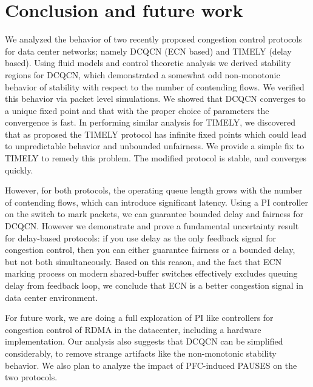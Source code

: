 \section{Conclusion and future work}
We analyzed  the behavior of two recently proposed congestion control protocols
for data center networks; namely DCQCN (ECN based) and TIMELY (delay based).
Using fluid models and control theoretic analysis we derived stability regions
for DCQCN, which demonstrated a somewhat odd non-monotonic behavior of stability
with respect to the number of contending flows. We verified this behavior via
packet level simulations. We showed that DCQCN converges to a unique
fixed point and that with the proper choice of parameters the convergence is
fast. In performing similar analysis for TIMELY, we discovered that as proposed
the TIMELY protocol has infinite fixed points which could lead to unpredictable
behavior and unbounded unfairness. We provide a simple fix to TIMELY to remedy
this problem. The modified protocol is stable, and converges quickly.

However, for both protocols, the operating queue length grows with the number of
contending flows, which can introduce significant latency. Using a PI controller
on the switch to mark packets, we can guarantee bounded delay and fairness for
DCQCN.  However we demonstrate and prove a fundamental uncertainty result for
delay-based protocols: if you use delay as the only feedback signal for
congestion control, then you can either guarantee fairness or a bounded delay,
but not both simultaneously. Based on this reason, and the fact that ECN marking
process on modern shared-buffer switches effectively excludes queuing delay from
feedback loop, we conclude that ECN is a better congestion signal in data center
environment. 

For future work, we are doing a full exploration of PI like controllers for
congestion control of RDMA in the datacenter, including a hardware
implementation. Our analysis also suggests that DCQCN can be simplified
considerably, to remove strange artifacts like the non-monotonic stability
behavior. We also plan to analyze the impact of PFC-induced PAUSES on the two
protocols.


